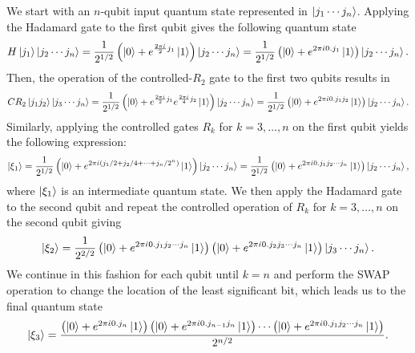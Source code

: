 \documentclass[10pt]{article}
\begin{document}
	We start with an $n$-qubit input quantum state represented in  $\ket{j_1\cdots j_n}$. Applying the Hadamard gate to the first qubit gives the following quantum state
	\begin{equation}
		H\ket{j_{1}}\ket{j_2 \cdots j_n}={\frac{1}{2^{1/2}}\left(\ket{0}+e^{\frac{2\pi \dot{\iota}}{2}j_{1}} \ket{1}\right)\ket{j_2 \cdots j_n}}=\frac{1}{2^{1/2}}\left(\ket{0}+e^{2\pi \dot{\iota}0.j_{1}} \ket{1}\right)\ket{j_2 \cdots j_n}.
	\end{equation}
	Then, the operation of the controlled-$R_{2}$ gate to the first two qubits results in
	\begin{equation}
		CR_{2}\ket{j_{1} j_2 }\ket{j_3 \cdots j_n}={\frac{1}{2^{1/2}}\left(\ket{0}+e^{\frac{2\pi \dot{\iota}}{2}j_{1}}e^{\frac{2\pi \dot{\iota}}{4}j_{2}} \ket{1}\right)\ket{j_2 \cdots j_n}}=\frac{1}{2^{1/2}}\left(\ket{0}+e^{2\pi \dot{\iota}0.j_{1}j_{2}} \ket{1}\right)\ket{j_2 \cdots j_n}.
	\end{equation}
	Similarly, applying the controlled gates $R_{k}$ for $k=3, \ldots, n$ on the first qubit yields the following expression:
	\begin{equation}
		\ket{\xi_1}={\frac{1}{2^{1/2}}\left(\ket{0}+e^{2\pi \dot{\iota}\left(j_1/2 +j_2/4 +\cdots+j_n/2^n\right)} \ket{1}\right)\ket{j_2 \cdots j_n}} =\frac{1}{2^{1/2}}\left(\ket{0}+e^{2\pi \dot{\iota}0.j_{1}j_{2}\cdots j_{n}} \ket{1}\right)\ket{j_2 \cdots j_n},
	\end{equation}
	where $\ket{\xi_1}$ is an intermediate quantum state. We then apply the Hadamard gate to the second qubit and repeat the controlled operation of $R_{k}$ for $k=3, \ldots, n$ on the second qubit giving
	\begin{equation}
		\ket{\xi_2} =   \frac{1}{2^{2/2}}\left(\ket{0}+e^{2\pi \dot{\iota}0.j_{1}j_{2}\cdots j_{n}} \ket{1}\right)\left(\ket{0}+e^{2\pi \dot{\iota}0.j_{2}j_{3}\cdots j_{n}} \ket{1}\right)\ket{j_3 \cdots j_n}.
	\end{equation}
	We continue in this fashion for each qubit until $k=n$ and perform the SWAP operation to change the location of the least significant bit, which leads us to the final quantum state
	\begin{equation}
		\ket{\xi_3} =\frac{\left(\ket{0}+e^{2\pi\dot{\iota} 0.j_n}\ket{1}\right)\left(\ket{0}+e^{2\pi\dot{\iota} 0.j_{n-1}j_n}\ket{1}\right)\cdots\left(\ket{0}+e^{2\pi\dot{\iota} 0.j_1 j_2\cdots j_n}\ket{1}\right) }{2^{n/2}}.
	\end{equation}
	
\end{document}
